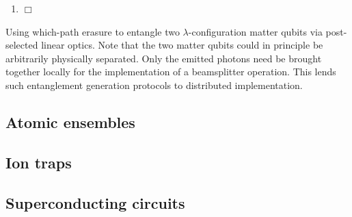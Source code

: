 \begin{table}[!htbp]
\begin{mdframed}[innertopmargin=3pt, innerbottommargin=3pt, nobreak]
{\begin{enumerate}
\begin{align}
\ket\psi_\mathrm{out}^{1,0} = \bra{1,0}_{A_2,B_2} \ket\psi_\mathrm{BS} = \frac{1}{2} (\ket{\!\uparrow,\downarrow}_{A_1,B_1} + \ket{\!\downarrow,\uparrow}_{A_1,B_1}), \nonumber \\
\ket\psi_\mathrm{out}^{0,1} = \bra{0,1}_{A_2,B_2} \ket\psi_\mathrm{BS} = \frac{1}{2} (\ket{\!\uparrow,\downarrow}_{A_1,B_1} - \ket{\!\downarrow,\uparrow}_{A_1,B_1}),
\end{align}
which is a Bell pair between the matter qubits.
    \item $\Box$
\end{enumerate}}
\end{mdframed}
\captionspacealg \caption{Using which-path erasure to entangle two $\lambda$-configuration matter qubits via post-selected linear optics. Note that the two matter qubits could in principle be arbitrarily physically separated. Only the emitted photons need be brought together locally for the implementation of a beamsplitter operation. This lends such entanglement generation protocols to distributed implementation.} \label{alg:which_path}
\end{table}

%
%

\subsection{Atomic ensembles}


%
%

\subsection{Ion traps}


%
%

\subsection{Superconducting circuits}\label{sec:artificial_atoms}


